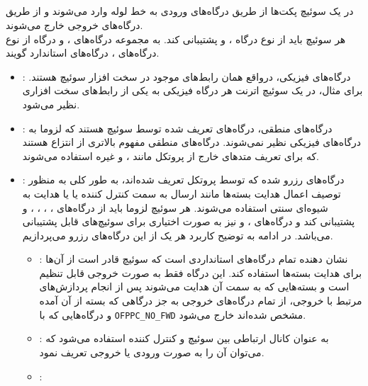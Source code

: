 \subsection{}
در یک سوئیچ  پکت‌ها از طریق درگاه‌های ورودی به خط لوله وارد می‌شوند و از طریق درگاه‌های خروجی خارج می‌شوند.\\
هر سوئیچ  باید از نوع درگاه ،  و  پشتیبانی کند. به مجموعه درگاه‌های ،  و درگاه  از نوع درگاه‌های ، درگاه‌های استاندارد گویند.

\begin{itemize}
	\item
{}:
درگاه‌های فیزیکی، درواقع همان رابط‌های موجود در سخت افزار سوئیچ هستند. برای مثال، در یک سوئیچ اترنت هر درگاه فیزیکی به یکی از رابط‌های سخت افزاری نظیر می‌شود.
	\item
{}:
درگاه‌های منطقی، درگاه‌های تعریف شده توسط سوئیچ هستند که لزوما به درگاه‌های فیزیکی نظیر نمی‌شوند. درگاه‌های منطقی مفهوم بالاتری از انتزاع هستند که برای تعریف متد‌های خارج از پروتکل  مانند ،  و غیره استفاده می‌شوند.
	\item
{}:
درگاه‌های رزرو شده که توسط پروتکل تعریف شده‌اند، به طور کلی به منظور توصیف اعمال هدایت بسته‌ها مانند ارسال به سمت کنترل کننده یا  یا هدایت به شیوه‌ای سنتی  استفاده می‌شوند. هر سوئیچ  لزوما باید از درگاه‌های ، ، ، ،  و  پشتیبانی کند و درگاه‌های ،  و  نیز به صورت اختیاری برای سوئیچ‌های  قابل پشتیبانی می‌باشد. در ادامه به توضیح کاربرد هر یک از این درگاه‌های رزرو می‌پردازیم.
\begin{itemize}
	\item {}:
نشان دهنده تمام درگاه‌های استانداردی است که سوئیچ قادر است از آن‌ها برای هدایت بسته‌ها استفاده کند. این درگاه فقط به صورت خروجی قابل تنظیم است و بسته‌هایی که به سمت آن هدایت می‌شوند پس از انجام پردازش‌های مرتبط با خروجی، از تمام درگاه‌های خروجی به جز درگاهی که بسته از آن آمده و درگاه‌هایی که با \texttt{OFPPC\_NO\_FWD} مشخص شده‌اند خارج می‌شود.
	\item {}:
به عنوان کانال ارتباطی بین سوئیچ و کنترل کننده استفاده می‌شود که می‌توان آن را به صورت ورودی یا خروجی تعریف نمود.
	\item {}:

\end{itemize}
\end{itemize}
